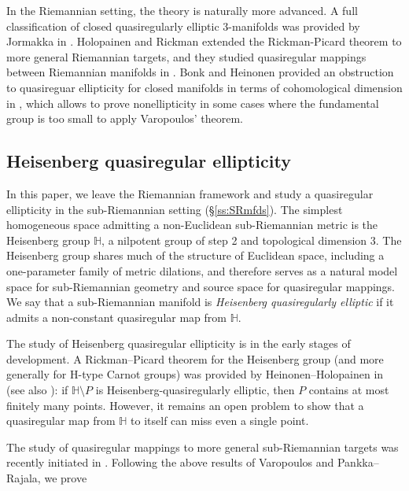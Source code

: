 \documentclass[10pt,letterpaper]{amsart}
\theoremstyle{definition}
\numberwithin{thm}{subsection}
\numberwithin{equation}{section}
\begin{document}
In the Riemannian setting, the theory is naturally more advanced.
 A full classification of
closed quasiregularly elliptic 3-manifolds was provided by
Jormakka in \cite{MR973719}. Holopainen and Rickman
\cite{MR1191342} extended the Rickman-Picard theorem to more
general Riemannian targets,
and they studied quasiregular mappings {between} Riemannian
manifolds in \cite{MR1667818}. Bonk and Heinonen provided an
obstruction to quasireguar ellipticity  for closed manifolds in
terms of cohomological dimension in \cite{MR1846030}, which allows
to prove nonellipticity in some cases where the fundamental group
is too small to apply Varopoulos' theorem.

\subsection{Heisenberg quasiregular ellipticity}
In this paper, we leave the Riemannian framework and study a
quasiregular ellipticity in the
{sub}-Riemannian setting (\S \ref{ss:SRmfds}). The simplest
homogeneous space admitting a
non-Euclidean sub-Riemannian metric is the Heisenberg group
${\mathbb H}$, a nilpotent group of step 2 and topological dimension 3.
The Heisenberg group shares much of the structure of Euclidean
space, including a one-parameter family of metric dilations, and
therefore serves as a natural model space for sub-Riemannian
geometry and source space for quasiregular mappings. We say that a
sub-Riemannian manifold is \emph{Heisenberg quasiregularly
elliptic} if it admits a non-constant quasiregular map from
${\mathbb H}$.

The study of Heisenberg
quasiregular ellipticity is in the early stages of development.
A Rickman--Picard theorem for the Heisenberg group (and more generally for H-type Carnot groups) was provided by Heinonen--Holopainen in \cite{MR1630785} (see also \cite{MR2252688}): if ${\mathbb H} \setminus P$ is Heisenberg-quasiregularly elliptic, then $P$ contains at most finitely many points. However, it remains an open problem to show that a quasiregular map from ${\mathbb H}$ to itself can miss even a single point.

The study of quasiregular mappings to more general sub-Riemannian targets was recently initiated in \cite{FLP,GNW,GL,GW}.
Following the above results of Varopoulos and Pankka--Rajala, we prove
\end{document}
